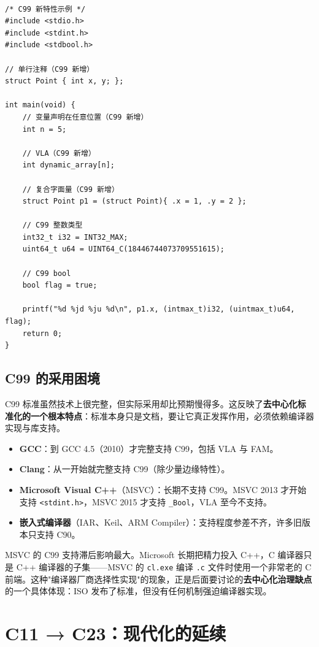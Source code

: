 \documentclass[12pt,a4paper,fontset=fandol]{ctexbook}
\newcommand{\clabel}{%
  \tcbox[on line,colback=cheadbg,colframe=cheadbg,
    boxrule=0pt,arc=1pt,left=2pt,right=2pt,top=1pt,bottom=1pt,
    colupper=white,fontupper=\scriptsize\bfseries]{C}}
\newcommand{\kw}[1]{\texttt{#1}}
\begin{document}
\clabel\ \begin{lstlisting}[style=cstyle]
/* C99 新特性示例 */
#include <stdio.h>
#include <stdint.h>
#include <stdbool.h>

// 单行注释（C99 新增）
struct Point { int x, y; };

int main(void) {
    // 变量声明在任意位置（C99 新增）
    int n = 5;

    // VLA（C99 新增）
    int dynamic_array[n];

    // 复合字面量（C99 新增）
    struct Point p1 = (struct Point){ .x = 1, .y = 2 };

    // C99 整数类型
    int32_t i32 = INT32_MAX;
    uint64_t u64 = UINT64_C(18446744073709551615);

    // C99 bool
    bool flag = true;

    printf("%d %jd %ju %d\n", p1.x, (intmax_t)i32, (uintmax_t)u64, flag);
    return 0;
}
\end{lstlisting}

\section{C99 的采用困境}

C99 标准虽然技术上很完整，但实际采用却比预期慢得多。这反映了\textbf{去中心化标准化的一个根本特点}：标准本身只是文档，要让它真正发挥作用，必须依赖编译器实现与库支持。

\begin{itemize}
  \item \textbf{GCC}：到 GCC 4.5（2010）才完整支持 C99，包括 VLA 与 FAM。
  \item \textbf{Clang}：从一开始就完整支持 C99（除少量边缘特性）。
  \item \textbf{Microsoft Visual C++}（MSVC）：长期不支持 C99。MSVC 2013 才开始支持 \texttt{<stdint.h>}，MSVC 2015 才支持 \kw{\_Bool}，VLA 至今不支持。
  \item \textbf{嵌入式编译器}（IAR、Keil、ARM Compiler）：支持程度参差不齐，许多旧版本只支持 C90。
\end{itemize}

MSVC 的 C99 支持滞后影响最大。Microsoft 长期把精力投入 C++，C 编译器只是 C++ 编译器的子集——MSVC 的 \kw{cl.exe} 编译 \kw{.c} 文件时使用一个非常老的 C 前端。这种"编译器厂商选择性实现"的现象，正是后面要讨论的\textbf{去中心化治理缺点}的一个具体体现：ISO 发布了标准，但没有任何机制强迫编译器实现。

\chapter{C11 → C23：现代化的延续}
\end{document}
